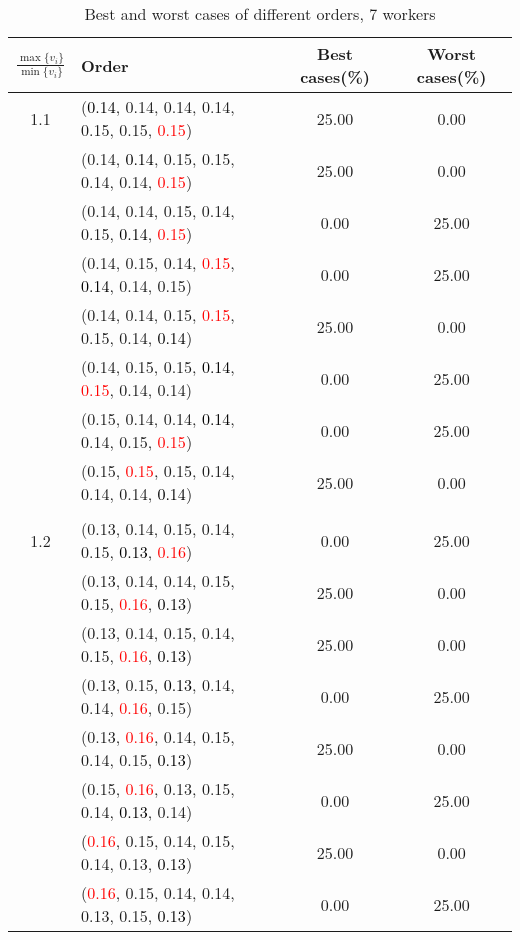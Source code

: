 \documentclass[10pt,a4paper]{report}
\begin{document}
\newpage\begin{center}
	\small
	\begin{longtable}{clcc}
		\caption{Best and worst cases of different orders, 7 workers}\\
		\toprule
		\setlength{\tabcolsep}{1mm}
		\renewcommand\baselinestretch{0.5}\selectfont
		$\frac{\max\{v_i\}}{\min\{v_i\}}$ & Order & Best cases(\%) & Worst cases(\%) \\
			\midrule		1.1			&(\textcolor{black}{0.14}, 0.14, 0.14, 0.14, 0.15, 0.15, \textcolor{red}{0.15})&25.00&0.00\\
			&(0.14, \textcolor{black}{0.14}, 0.15, 0.15, 0.14, 0.14, \textcolor{red}{0.15})&25.00&0.00\\
			&(0.14, 0.14, 0.15, 0.14, 0.15, \textcolor{black}{0.14}, \textcolor{red}{0.15})&0.00&25.00\\
			&(0.14, 0.15, 0.14, \textcolor{red}{0.15}, \textcolor{black}{0.14}, 0.14, 0.15)&0.00&25.00\\
			&(0.14, 0.14, 0.15, \textcolor{red}{0.15}, 0.15, 0.14, \textcolor{black}{0.14})&25.00&0.00\\
			&(0.14, 0.15, 0.15, \textcolor{black}{0.14}, \textcolor{red}{0.15}, 0.14, 0.14)&0.00&25.00\\
			&(0.15, 0.14, 0.14, \textcolor{black}{0.14}, 0.14, 0.15, \textcolor{red}{0.15})&0.00&25.00\\
			&(0.15, \textcolor{red}{0.15}, 0.15, 0.14, 0.14, 0.14, \textcolor{black}{0.14})&25.00&0.00\\
		&&&\\
		1.2			&(0.13, 0.14, 0.15, 0.14, 0.15, \textcolor{black}{0.13}, \textcolor{red}{0.16})&0.00&25.00\\
			&(0.13, 0.14, 0.14, 0.15, 0.15, \textcolor{red}{0.16}, \textcolor{black}{0.13})&25.00&0.00\\
			&(0.13, 0.14, 0.15, 0.14, 0.15, \textcolor{red}{0.16}, \textcolor{black}{0.13})&25.00&0.00\\
			&(0.13, 0.15, \textcolor{black}{0.13}, 0.14, 0.14, \textcolor{red}{0.16}, 0.15)&0.00&25.00\\
			&(0.13, \textcolor{red}{0.16}, 0.14, 0.15, 0.14, 0.15, \textcolor{black}{0.13})&25.00&0.00\\
			&(0.15, \textcolor{red}{0.16}, 0.13, 0.15, 0.14, \textcolor{black}{0.13}, 0.14)&0.00&25.00\\
			&(\textcolor{red}{0.16}, 0.15, 0.14, 0.15, 0.14, 0.13, \textcolor{black}{0.13})&25.00&0.00\\
			&(\textcolor{red}{0.16}, 0.15, 0.14, 0.14, 0.13, 0.15, \textcolor{black}{0.13})&0.00&25.00\\

\end{longtable}
\end{center}
\end{document}
